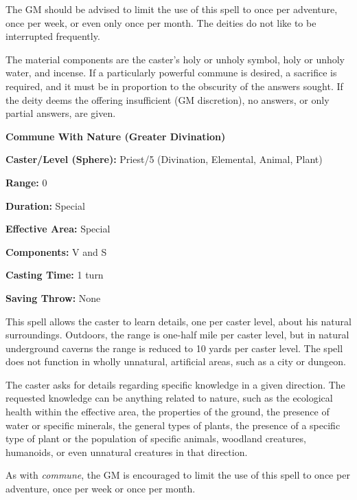 \begin{multicols}{2}
The GM should be advised to limit the use of this spell to once per adventure, once per week, or even only once per month.  The deities do not like to be interrupted frequently.

The material components are the caster's holy or unholy symbol, holy or unholy water, and incense. If a particularly powerful commune is desired, a sacrifice is required, and it must be in proportion to the obscurity of the answers sought.  If the deity deems the offering insufficient (GM discretion), no answers, or only partial answers, are given. 

\vspace{1em}

\noindent
\begin{minipage}{\columnwidth}

\noindent \textbf{Commune With Nature (Greater Divination)}

\noindent \textbf{Caster/Level (Sphere):} Priest/5 (Divination, Elemental, Animal, Plant)

\noindent \textbf{Range:} 0

\noindent \textbf{Duration:} Special

\noindent \textbf{Effective Area:} Special

\noindent \textbf{Components:} V and S

\noindent \textbf{Casting Time:} 1 turn

\noindent \textbf{Saving Throw:} None

\end{minipage}

This spell allows the caster to learn details, one per caster level, about his natural surroundings.  Outdoors, the range is one-half mile per caster level, but in natural underground caverns the range is reduced to 10 yards per caster level.  The spell does not function in wholly unnatural, artificial areas, such as a city or dungeon.

The caster asks for details regarding specific knowledge in a given direction.  The requested knowledge can be anything related to nature, such as the ecological health within the effective area, the properties of the ground, the presence of water or specific minerals, the general types of plants, the presence of a specific type of plant or the population of specific animals, woodland creatures, humanoids, or even unnatural creatures in that direction.  

As with \textit{commune}, the GM is encouraged to limit the use of this spell to once per adventure, once per week or once per month.


\end{multicols}
